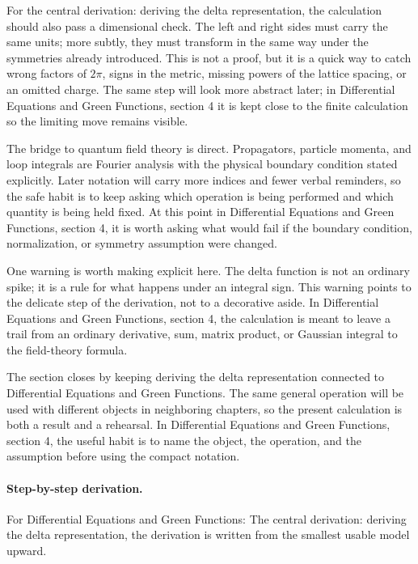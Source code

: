 For the central derivation: deriving the delta representation, the calculation should also pass a dimensional check.  The left and right sides must carry the same units; more subtly, they must transform in the same way under the symmetries already introduced.  This is not a proof, but it is a quick way to catch wrong factors of \(2\pi\), signs in the metric, missing powers of the lattice spacing, or an omitted charge.  The same step will look more abstract later; in Differential Equations and Green Functions, section 4 it is kept close to the finite calculation so the limiting move remains visible.

The bridge to quantum field theory is direct.  Propagators, particle momenta, and loop integrals are Fourier analysis with the physical boundary condition stated explicitly.  Later notation will carry more indices and fewer verbal reminders, so the safe habit is to keep asking which operation is being performed and which quantity is being held fixed.  At this point in Differential Equations and Green Functions, section 4, it is worth asking what would fail if the boundary condition, normalization, or symmetry assumption were changed.

One warning is worth making explicit here.  The delta function is not an ordinary spike; it is a rule for what happens under an integral sign.  This warning points to the delicate step of the derivation, not to a decorative aside.  In Differential Equations and Green Functions, section 4, the calculation is meant to leave a trail from an ordinary derivative, sum, matrix product, or Gaussian integral to the field-theory formula.

The section closes by keeping deriving the delta representation connected to Differential Equations and Green Functions.  The same general operation will be used with different objects in neighboring chapters, so the present calculation is both a result and a rehearsal.  In Differential Equations and Green Functions, section 4, the useful habit is to name the object, the operation, and the assumption before using the compact notation.



\paragraph{Step-by-step derivation.}

For Differential Equations and Green Functions: The central derivation: deriving the delta representation, the derivation is written from the smallest usable model upward.


